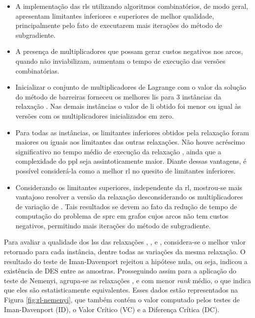\begin{itemize}
\item A implementação das \gls{rl}s utilizando algoritmos combinatórios, de modo
geral,  apresentam  limitantes  inferiores  e superiores  de  melhor  qualidade,
principalmente pelo fato de executarem mais iterações do método de subgradiente.
\item A presença de multiplicadores que possam gerar custos negativos nos arcos,
quando não inviabilizam, aumentam o tempo de execução das versões combinatórias.
\item  Inicializar o  conjunto de  multiplicadores de  Lagrange com  o valor  da
solução do método de barreiras forneceu  os melhores \gls{li}s para 3 instâncias
da relaxação {\rlq}. Nas demais instâncias  o valor de \gls{li} obtido foi menor
ou igual às versões com os multiplicadores inicializados em zero.
\item Para todas as instâncias,  os limitantes inferiores obtidos pela relaxação
{\rlq} foram maiores  ou iguais aos limitantes das outras  relaxações. Não houve
acréscimo significativo  no tempo médio  de execução da relaxação  {\rlq}, ainda
que  a complexidade  do  \gls{ppl} seja  assintoticamente  maior. Diante  dessas
vantagens,  é  possível  considerá-la  como  a melhor  \gls{rl}  no  quesito  de
limitantes inferiores.
\item  Considerando   os  limitantes   superiores,  independente   da  \gls{rl},
mostrou-se  mais vantajoso  resolver a  versão da  relaxação desconsiderando  os
multiplicadores de  variação de {\delay}.  Tais resultados  se devem ao  fato da
redução de tempo  de computação do problema de \gls{sprc}  em grafos cujos arcos
não tem custos negativos, permitindo mais iterações do método de subgradiente.
\end{itemize}

Para  avaliar a  qualidade dos  \gls{ls}s das  relaxações {\rlu,  \rld, \rlt}  e
{\rlq}, considera-se o melhor valor  retornado para cada instância, dentre todas
as variações da mesma relaxação. O resultado do teste de Iman-Davenport rejeitou
a  hipótese nula,  ou  seja, indicou  a  existência de  DES  entre as  amostras.
Prosseguindo assim para a aplicação do teste de Nemenyi, agrupa-se as relaxações
{\rld, \rlt}  e {\rlq} com  menor {\em  rank} médio, o  que indica que  eles são
estatisticamente  equivalentes.  Esses  dados   estão  representados  na  Figura
\ref{fig:rl-nemenyi},  que  também contém  o  valor  computado pelos  testes  de
Iman-Davenport (ID), o Valor Crítico (VC) e a Diferença Crítica (DC).

